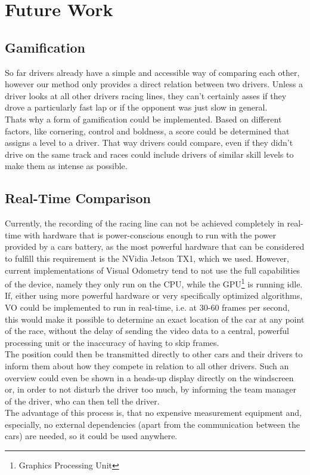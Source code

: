 \section{Future Work}
\label{sec:future_work}

\subsection{Gamification}
\label{sec:gamification}
So far drivers already have a simple and accessible way of comparing each other, however our method only provides a direct relation between two drivers. Unless a driver looks at all other drivers racing lines, they can't certainly asses if they drove a particularly fast lap or if the opponent was just slow in general.\\
Thats why a form of gamification could be implemented. Based on different factors, like cornering, control and boldness, a score could be determined that assigns a level to a driver. That way drivers could compare, even if they didn't drive on the same track and races could include drivers of similar skill levels to make them as intense as possible.

\subsection{Real-Time Comparison}
Currently, the recording of the racing line can not be achieved completely in real-time with hardware that is power-conscious enough to run with the power provided by a cars battery, as the most powerful hardware that can be considered to fulfill this requirement is the NVidia Jetson TX1, which we used. However, current implementations of Visual Odometry tend to not use the full capabilities of the device, namely they only run on the CPU, while the GPU\footnote{Graphics Processing Unit} is running idle. If, either using more powerful hardware or very specifically optimized algorithms, VO could be implemented to run in real-time, i.e. at 30-60 frames per second, this would make it possible to determine an exact location of the car at any point of the race, without the delay of sending the video data to a central, powerful processing unit or the inaccuracy of having to skip frames.\\
The position could then be transmitted directly to other cars and their drivers to inform them about how they compete in relation to all other drivers. Such an overview could even be shown in a heads-up display directly on the windscreen or, in order to not disturb the driver too much, by informing the team manager of the driver, who can then tell the driver.\\
The advantage of this process is, that no expensive measurement equipment and, especially, no external dependencies (apart from the communication between the cars) are needed, so it could be used anywhere.

